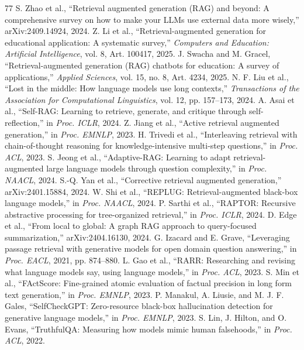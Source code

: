 \documentclass[conference]{IEEEtran}
\begin{document}
\begin{thebibliography}{77}
 S. Zhao et al., ``Retrieval augmented generation (RAG) and beyond: A comprehensive survey on how to make your LLMs use external data more wisely,'' arXiv:2409.14924, 2024.
 Z. Li et al., ``Retrieval-augmented generation for educational application: A systematic survey,'' \emph{Computers and Education: Artificial Intelligence}, vol. 8, Art. 100417, 2025.
 J. Swacha and M. Gracel, ``Retrieval-augmented generation (RAG) chatbots for education: A survey of applications,'' \emph{Applied Sciences}, vol. 15, no. 8, Art. 4234, 2025.
 N. F. Liu et al., ``Lost in the middle: How language models use long contexts,'' \emph{Transactions of the Association for Computational Linguistics}, vol. 12, pp. 157--173, 2024.
 A. Asai et al., ``Self-RAG: Learning to retrieve, generate, and critique through self-reflection,'' in \emph{Proc. ICLR}, 2024.
 Z. Jiang et al., ``Active retrieval augmented generation,'' in \emph{Proc. EMNLP}, 2023.
 H. Trivedi et al., ``Interleaving retrieval with chain-of-thought reasoning for knowledge-intensive multi-step questions,'' in \emph{Proc. ACL}, 2023.
 S. Jeong et al., ``Adaptive-RAG: Learning to adapt retrieval-augmented large language models through question complexity,'' in \emph{Proc. NAACL}, 2024.
 S.-Q. Yan et al., ``Corrective retrieval augmented generation,'' arXiv:2401.15884, 2024.
 W. Shi et al., ``REPLUG: Retrieval-augmented black-box language models,'' in \emph{Proc. NAACL}, 2024.
 P. Sarthi et al., ``RAPTOR: Recursive abstractive processing for tree-organized retrieval,'' in \emph{Proc. ICLR}, 2024.
 D. Edge et al., ``From local to global: A graph RAG approach to query-focused summarization,'' arXiv:2404.16130, 2024.
 G. Izacard and E. Grave, ``Leveraging passage retrieval with generative models for open domain question answering,'' in \emph{Proc. EACL}, 2021, pp. 874--880.
 L. Gao et al., ``RARR: Researching and revising what language models say, using language models,'' in \emph{Proc. ACL}, 2023.
 S. Min et al., ``FActScore: Fine-grained atomic evaluation of factual precision in long form text generation,'' in \emph{Proc. EMNLP}, 2023.
 P. Manakul, A. Liusie, and M. J. F. Gales, ``SelfCheckGPT: Zero-resource black-box hallucination detection for generative language models,'' in \emph{Proc. EMNLP}, 2023.
 S. Lin, J. Hilton, and O. Evans, ``TruthfulQA: Measuring how models mimic human falsehoods,'' in \emph{Proc. ACL}, 2022.

\end{thebibliography}
\end{document}
